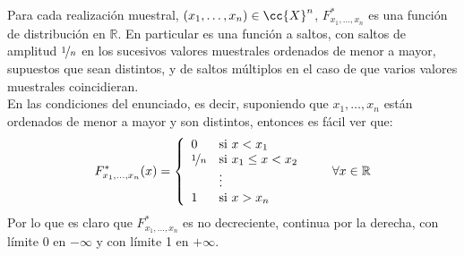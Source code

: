 \begin{ejercicio}
    Para cada realización muestral, $(x_1, \ldots, x_n)\in \cc{X}^n$, $F_{x_1,\ldots,x_n}^\ast$ es una función de distribución en $\mathbb{R}$. En particular es una función a saltos, con saltos de amplitud $\nicefrac{1}{n}$ en los sucesivos valores muestrales ordenados de menor a mayor, supuestos que sean distintos, y de saltos múltiplos en el caso de que varios valores muestrales coincidieran.\\

    \noindent
    En las condiciones del enunciado, es decir, suponiendo que $x_1, \ldots, x_n$ están ordenados de menor a mayor y son distintos, entonces es fácil ver que:
    \begin{equation*}
        F_{x_1, \ldots, x_n}^\ast (x) = \left\{\begin{array}{ll}
                0 & \text{si\ } x < x_1 \\
                \nicefrac{1}{n} & \text{si\ } x_1 \leq x < x_2 \\
                                &\vdots \\
                            1 & \text{si\ } x > x_n
        \end{array}\right. \qquad \forall x\in \mathbb{R}
    \end{equation*}
    Por lo que es claro que $F_{x_1, \ldots, x_n}^\ast $ es no decreciente, continua por la derecha, con límite 0 en $-\infty$ y con límite 1 en $+\infty$.
\end{ejercicio}

